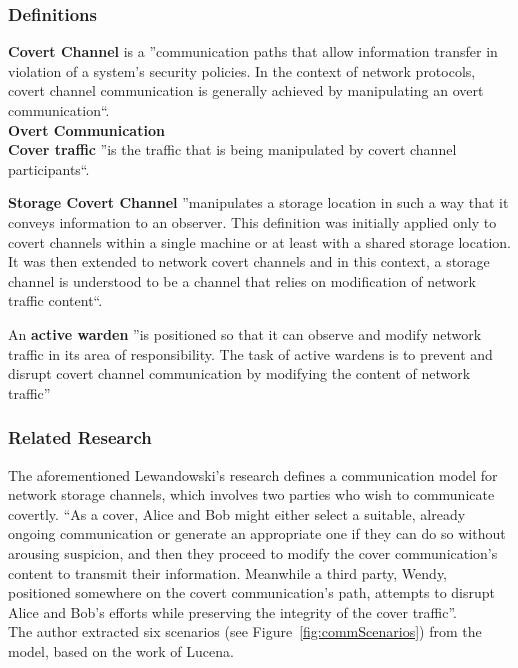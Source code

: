 \documentclass[12pt]{article}
\begin{document}
\subsubsection{Definitions}
\label{subsub:definitions}

\textbf{Covert Channel} is a ''communication paths that allow information transfer in violation of a system’s security policies. In the context of network protocols, covert channel communication is generally achieved by 
manipulating an overt communication``\cite{netaware}.\\

\textbf{Overt Communication}\\

\textbf{Cover traffic} ''is the traffic that is being manipulated by covert channel participants``\cite{netaware}.

\textbf{Storage Covert Channel} ''manipulates a storage location in such a way that it conveys information to an observer. This definition was initially applied only to covert channels within a single machine or at least 
with a shared storage location. It was then extended to network covert channels and in this context, a storage channel is understood to be a channel that relies on modification of network traffic content``\cite{netaware}.

An \textbf{active warden} ''is positioned so that it can observe and modify network traffic in its area of responsibility. The task of active wardens is to prevent and disrupt covert channel communication by modifying the 
content of network traffic''\cite{netaware}\\

\subsubsection{Related Research}

The aforementioned Lewandowski's research defines a communication model for network storage channels, which involves two parties who wish to communicate covertly. ``As a cover, Alice and Bob might either select a suitable, 
already ongoing communication or generate an appropriate one if they can do so without arousing suspicion, and then they proceed to modify the cover communication’s content to transmit their information. Meanwhile a 
third party, Wendy, positioned somewhere on the covert communication’s path, attempts to disrupt Alice and Bob’s efforts while preserving the integrity of the cover traffic''.\\
The author extracted six scenarios (see Figure~\ref{fig:commScenarios}) from the model, based on the work of Lucena\cite{lucena}.
\end{document}
